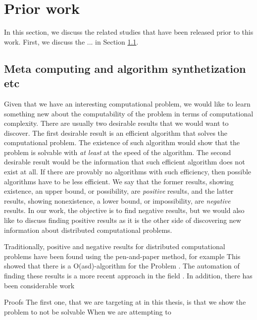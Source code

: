 
\section{Prior work} \label{sec:prior_work}
In this section, we discuss the related studies that have been released prior to this work.
First, we discuss the ... in Section \ref{sec:prior_work:title_a}.

\subsection{Meta computing and algorithm synthetization etc} \label{sec:prior_work:title_a}

Given that we have an interesting computational problem, we would like to learn something new about the computability of the problem in terms of computational complexity.
There are usually two desirable results that we would want to discover.
The first desirable result is an efficient algorithm that solves the computational problem.
The existence of such algorithm would show that the problem is solvable with \emph{at least} at the speed of the algorithm.
The second desirable result would be the information that such efficient algorithm does not exist at all.
If there are provably no algorithms with such efficiency, then possible algorithms have to be less efficient.
We say that the former results, showing existence, an upper bound, or possibility, are \emph{positive} results, and the latter results, showing nonexistence, a lower bound, or impossibility, are \emph{negative} results.
In our work, the objective is to find negative results, but we would also like to discuss finding positive results as it is the other side of discovering new information about distributed computational problems.%

Traditionally, positive and negative results for distributed computational problems have been found using the pen-and-paper method, for example This showed that there is a O(asd)-algorithm for the Problem \cite{} \cite{}.
The automation of finding these results is a more recent approach in the field \cite{} \cite{}.
In addition, there has been considerable work 

Proofs 
The first one, that we are targeting at in this thesis, is that we show the problem to not be solvable 
When we are attempting to 


